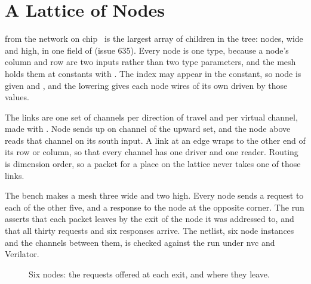\section{A Lattice of Nodes}
\label{sec:x-mesh}

 from the network on chip~\cite{noc} is the
largest array of children in the tree:  nodes,  wide
and  high, in one field of  (issue 635). Every node
is one type, because a node's column and row are two inputs rather
than two type parameters, and the mesh holds them at constants with
. The index may appear in the constant, so node  is
given  and
, and the lowering gives each node
wires of its own driven by those values.

The links are one set of channels per direction of travel and per
virtual channel, made with . Node  sends up on
channel  of the upward set, and the node above reads that
channel on its south input. A link at an edge wraps to the other end
of its row or column, so that every channel has one driver and one
reader. Routing is dimension order, so a packet for a place on the
lattice never takes one of those links.

The bench makes a mesh three wide and two high. Every node sends a
request to each of the other five, and a response to the node at the
opposite corner. The run asserts that each packet leaves by the exit
of the node it was addressed to, and that all thirty requests and six
responses arrive. The netlist, six node instances and the channels
between them, is checked against the run under nvc and Verilator.

\begin{figure}[htbp]
\centering

\caption{Six nodes: the requests offered at each exit, and where they
leave.}
\label{fig:x-mesh}
\end{figure}




